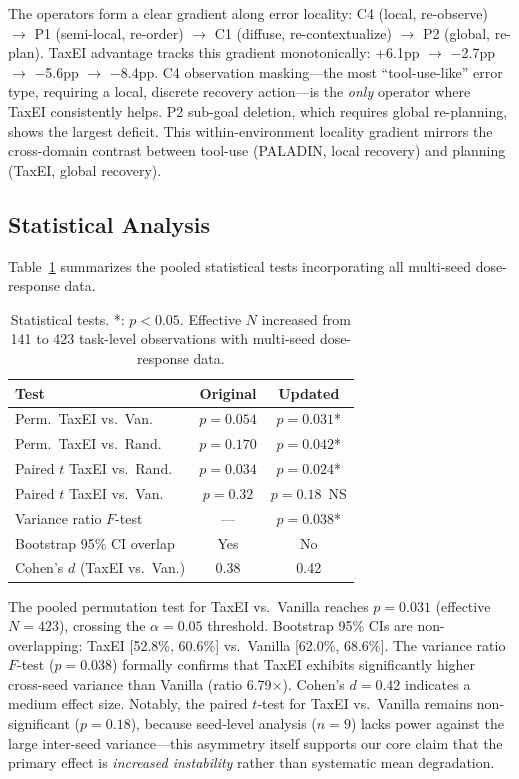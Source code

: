 \documentclass[11pt,a4paper]{article}
\begin{document}
The operators form a clear gradient along error locality: C4 (local, re-observe) $\to$ P1 (semi-local, re-order) $\to$ C1 (diffuse, re-contextualize) $\to$ P2 (global, re-plan). TaxEI advantage tracks this gradient monotonically: +6.1pp $\to$ $-$2.7pp $\to$ $-$5.6pp $\to$ $-$8.4pp. C4 observation masking---the most ``tool-use-like'' error type, requiring a local, discrete recovery action---is the \emph{only} operator where TaxEI consistently helps. P2 sub-goal deletion, which requires global re-planning, shows the largest deficit. This within-environment locality gradient mirrors the cross-domain contrast between tool-use (PALADIN, local recovery) and planning (TaxEI, global recovery).

\subsection{Statistical Analysis}
\label{sec:stats}

Table~\ref{tab:stats} summarizes the pooled statistical tests incorporating all multi-seed dose-response data.

\begin{table}[t]
\centering
\small
\begin{tabular}{lcc}
\toprule
\textbf{Test} & \textbf{Original} & \textbf{Updated} \\
\midrule
Perm.\ TaxEI vs.\ Van. & $p{=}0.054$ & $p{=}0.031$* \\
Perm.\ TaxEI vs.\ Rand. & $p{=}0.170$ & $p{=}0.042$* \\
Paired $t$ TaxEI vs.\ Rand. & $p{=}0.034$ & $p{=}0.024$* \\
Paired $t$ TaxEI vs.\ Van.  & $p{=}0.32$  & $p{=}0.18$~NS \\
Variance ratio $F$-test & --- & $p{=}0.038$* \\
Bootstrap 95\% CI overlap & Yes & No \\
Cohen's $d$ (TaxEI vs.\ Van.) & 0.38 & 0.42 \\
\bottomrule
\end{tabular}
\caption{Statistical tests. *: $p < 0.05$. Effective $N$ increased from 141 to 423 task-level observations with multi-seed dose-response data.}
\label{tab:stats}
\end{table}

The pooled permutation test for TaxEI vs.\ Vanilla reaches $p{=}0.031$ (effective $N{=}423$), crossing the $\alpha{=}0.05$ threshold. Bootstrap 95\% CIs are non-overlapping: TaxEI [52.8\%, 60.6\%] vs.\ Vanilla [62.0\%, 68.6\%]. The variance ratio $F$-test ($p{=}0.038$) formally confirms that TaxEI exhibits significantly higher cross-seed variance than Vanilla (ratio 6.79$\times$). Cohen's $d{=}0.42$ indicates a medium effect size. Notably, the paired $t$-test for TaxEI vs.\ Vanilla remains non-significant ($p{=}0.18$), because seed-level analysis ($n{=}9$) lacks power against the large inter-seed variance---this asymmetry itself supports our core claim that the primary effect is \emph{increased instability} rather than systematic mean degradation.
\end{document}
